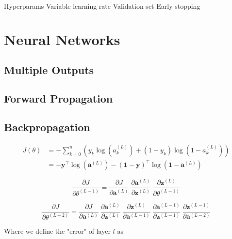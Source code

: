 \documentclass{article}[11pt]
\begin{document}
    Hyperparams
    Variable learning rate
    Validation set
    Early stopping



\section{Neural Networks}

    \subsection{Multiple Outputs}
    
    \subsection{Forward Propagation}

    \subsection{Backpropagation}
        
        
        $$ \begin{aligned}
        J(\theta)
        &= - \sum_{k=0}^{n} \left( y_k \log(a^{(L)}_k) + (1 - y_k) \log(1 - a^{(L)}_k) \right) \\
        &= -\mathbf{y}^\top \log(\mathbf{a}^{(L)}) - (\mathbf{1}-\mathbf{y})^\top \log(\mathbf{1} - \mathbf{a}^{(L)})
        \end{aligned} $$
        
        
        
        $$
        \frac{\partial J}{\partial \theta^{(L-1)}} =
            \frac{\partial J}{\partial \mathbf{a}^{(L)}} \
            \frac{\partial \mathbf{a}^{(L)}}{\partial \mathbf{z}^{(L)}} \
            \frac{\partial \mathbf{z}^{(L)}}{\partial \theta^{(L-1)}}
        $$



        $$
        \frac{\partial J}{\partial \theta^{(L-2)}} =
            \frac{\partial J}{\partial \mathbf{a}^{(L)}} \
            \frac{\partial \mathbf{a}^{(L)}}{\partial \mathbf{z}^{(L)}} \
            \frac{\partial \mathbf{z}^{(L)}}{\partial \mathbf{a}^{(L-1)}} \
            \frac{\partial \mathbf{a}^{(L-1)}}{\partial \mathbf{z}^{(L-1)}} \
            \frac{\partial \mathbf{z}^{(L-1)}}{\partial \mathbf{a}^{(L-2)}}
        $$



        Where we define the "error" of layer $l$ as
    
\end{document}
